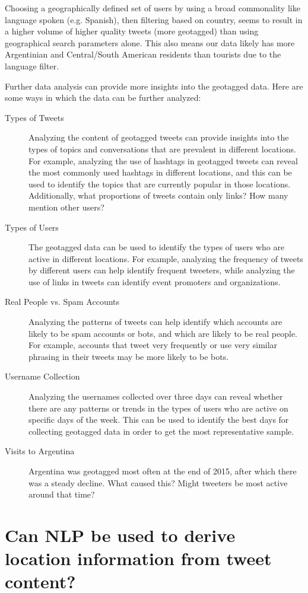 Choosing a geographically defined set of users by using a broad commonality like language spoken (e.g. Spanish), then filtering based on country, seems to result in a higher volume of higher quality tweets (more geotagged) than using geographical search parameters alone. This also means our data likely has more Argentinian and Central/South American residents than tourists due to the language filter.

Further data analysis can provide more insights into the geotagged data. Here are some ways in which the data can be further analyzed:
\begin{description}
    \item[Types of Tweets] Analyzing the content of geotagged tweets can provide insights into the types of topics and conversations that are prevalent in different locations. For example, analyzing the use of hashtags in geotagged tweets can reveal the most commonly used hashtags in different locations, and this can be used to identify the topics that are currently popular in those locations. Additionally, what proportions of tweets contain only links? How many mention other users?
    \item[Types of Users] The geotagged data can be used to identify the types of users who are active in different locations. For example, analyzing the frequency of tweets by different users can help identify frequent tweeters, while analyzing the use of links in tweets can identify event promoters and organizations.
    \item[Real People vs. Spam Accounts] Analyzing the patterns of tweets can help identify which accounts are likely to be spam accounts or bots, and which are likely to be real people. For example, accounts that tweet very frequently or use very similar phrasing in their tweets may be more likely to be bots.
    \item[Username Collection] Analyzing the usernames collected over three days can reveal whether there are any patterns or trends in the types of users who are active on specific days of the week. This can be used to identify the best days for collecting geotagged data in order to get the most representative sample.
    \item[Visits to Argentina] Argentina was geotagged most often at the end of 2015, after which there was a steady decline. What caused this? Might tweeters be most active around that time?
\end{description}

\section{Can NLP be used to derive location information from tweet content?}

